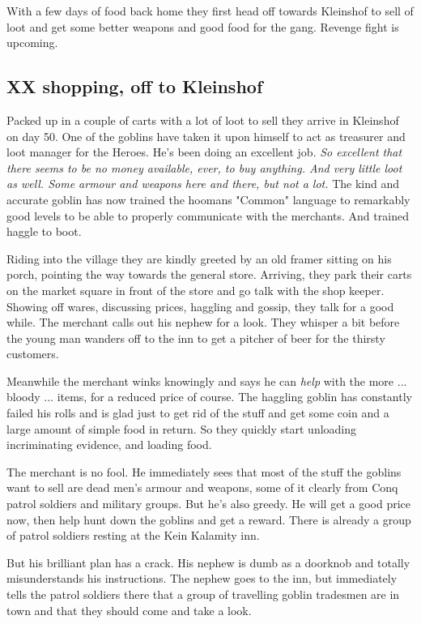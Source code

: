 With a few days of food back home they first head off towards Kleinshof to sell of loot and get some better weapons and good food for the gang. Revenge fight is upcoming.


\subsection*{XX shopping, off to Kleinshof}

Packed up in a couple of carts with a lot of loot to sell they arrive in Kleinshof on day 50. One of the goblins have taken it upon himself to act as treasurer and loot manager for the Heroes. He's been doing an excellent job. \emph{So excellent that there seems to be no money available, ever, to buy anything. And very little loot as well. Some armour and weapons here and there, but not a lot.} The kind and accurate goblin has now trained the hoomans "Common" language to remarkably good levels to be able to properly communicate with the merchants. And trained haggle to boot.

Riding into the village they are kindly greeted by an old framer sitting on his porch, pointing the way towards the general store. Arriving, they park their carts on the market square in front of the store and go talk with the shop keeper. Showing off wares, discussing prices, haggling and gossip, they talk for a good while. The merchant calls out his nephew for a look. They whisper a bit before the young man wanders off to the inn to get a pitcher of beer for the thirsty customers.

Meanwhile the merchant winks knowingly and says he can \emph{help} with the more ... bloody ... items, for a reduced price of course. The haggling goblin has constantly failed his rolls and is glad just to get rid of the stuff and get some coin and a large amount of simple food in return. So they quickly start unloading incriminating evidence, and loading food.

\begin{readoutloud}
The merchant is no fool. He immediately sees that most of the stuff the goblins want to sell are dead men's armour and weapons, some of it clearly from Conq patrol soldiers and military groups. But he's also greedy. He will get a good price now, then help hunt down the goblins and get a reward. There is already a group of patrol soldiers resting at the Kein Kalamity inn.

But his brilliant plan has a crack. His nephew is dumb as a doorknob and totally misunderstands his instructions. The nephew goes to the inn, but immediately tells the patrol soldiers there that a group of travelling goblin tradesmen are in town and that they should come and take a look.
\end{readoutloud}

